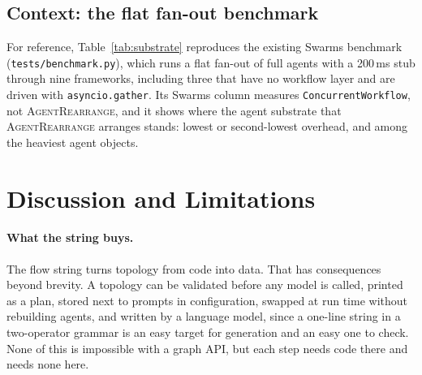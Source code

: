 \documentclass[11pt]{article}
\newcommand{\code}[1]{\texttt{#1}}
\newcommand{\AR}{\textsc{AgentRearrange}}
\begin{document}
\subsection{Context: the flat fan-out benchmark}

For reference, Table~\ref{tab:substrate} reproduces the existing Swarms benchmark (\code{tests/benchmark.py}), which runs a flat fan-out of full agents with a 200\,ms stub through nine frameworks, including three that have no workflow layer and are driven with \code{asyncio.gather}. Its Swarms column measures \code{ConcurrentWorkflow}, not \AR{}, and it shows where the agent substrate that \AR{} arranges stands: lowest or second-lowest overhead, and among the heaviest agent objects.

\begin{table}[ht]
\centering
{}
\caption{Flat fan-out of full agents with a 200\,ms stubbed model, from \code{tests/benchmark.py}. The 100-agent rows are medians of three runs; the 1{,}000-agent rows are one run. The LangGraph and LangChain columns here use function nodes and prompt chains, which are lighter than agents.}
\label{tab:substrate}
\end{table}

\section{Discussion and Limitations}
\label{sec:limits}

\paragraph{What the string buys.}
The flow string turns topology from code into data. That has consequences beyond brevity. A topology can be validated before any model is called, printed as a plan, stored next to prompts in configuration, swapped at run time without rebuilding agents, and written by a language model, since a one-line string in a two-operator grammar is an easy target for generation and an easy one to check. None of this is impossible with a graph API, but each step needs code there and needs none here.
\end{document}
